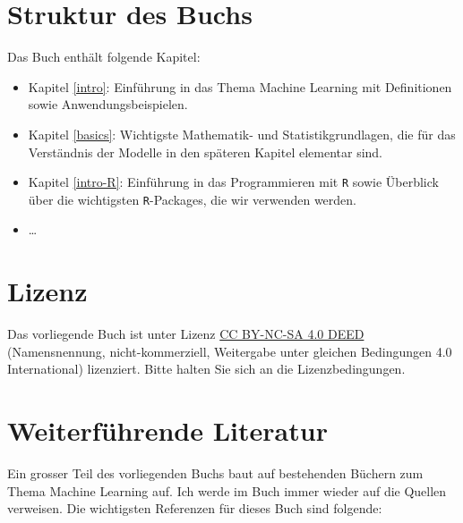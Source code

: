 \documentclass[
]{book}
\providecommand{\tightlist}{%
  \setlength{\itemsep}{0pt}\setlength{\parskip}{0pt}}
\begin{document}
\hypertarget{struktur-des-buchs}{%
\section*{Struktur des Buchs}\label{struktur-des-buchs}}

Das Buch enthält folgende Kapitel:

\begin{itemize}
\tightlist
\item
  Kapitel \ref{intro}: Einführung in das Thema Machine Learning mit Definitionen sowie Anwendungsbeispielen.
\item
  Kapitel \ref{basics}: Wichtigste Mathematik- und Statistikgrundlagen, die für das Verständnis der Modelle in den späteren Kapitel elementar sind.
\item
  Kapitel \ref{intro-R}: Einführung in das Programmieren mit \texttt{R} sowie Überblick über die wichtigsten \texttt{R}-Packages, die wir verwenden werden.
\item
  \ldots{}
\end{itemize}

\hypertarget{lizenz}{%
\section*{Lizenz}\label{lizenz}}

Das vorliegende Buch ist unter Lizenz \href{https://creativecommons.org/licenses/by-nc-sa/4.0/deed.de}{CC BY-NC-SA 4.0 DEED} (Namensnennung, nicht-kommerziell, Weitergabe unter gleichen Bedingungen 4.0 International) lizenziert. Bitte halten Sie sich an die Lizenzbedingungen.

\hypertarget{weiterfuxfchrende-literatur}{%
\section*{Weiterführende Literatur}\label{weiterfuxfchrende-literatur}}

Ein grosser Teil des vorliegenden Buchs baut auf bestehenden Büchern zum Thema Machine Learning auf. Ich werde im Buch immer wieder auf die Quellen verweisen. Die wichtigsten Referenzen für dieses Buch sind folgende:
\end{document}
